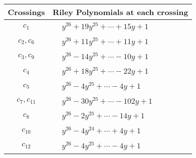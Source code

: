 \documentclass[1p]{elsarticle_modified}
\theoremstyle{definition}
\begin{document}
\begin{tabular}{m{50pt}|m{274pt}}
Crossings & \hspace{64pt}Riley Polynomials at each crossing \\
\hline $$\begin{aligned}c_{1}\end{aligned}$$&$\begin{aligned}
&y^{26}+19 y^{25}+\cdots+15 y+1
\end{aligned}$\\
\hline $$\begin{aligned}c_{2},c_{6}\end{aligned}$$&$\begin{aligned}
&y^{26}+11 y^{25}+\cdots+11 y+1
\end{aligned}$\\
\hline $$\begin{aligned}c_{3},c_{9}\end{aligned}$$&$\begin{aligned}
&y^{26}-14 y^{25}+\cdots-10 y+1
\end{aligned}$\\
\hline $$\begin{aligned}c_{4}\end{aligned}$$&$\begin{aligned}
&y^{26}+18 y^{25}+\cdots-22 y+1
\end{aligned}$\\
\hline $$\begin{aligned}c_{5}\end{aligned}$$&$\begin{aligned}
&y^{26}-4 y^{25}+\cdots-4 y+1
\end{aligned}$\\
\hline $$\begin{aligned}c_{7},c_{11}\end{aligned}$$&$\begin{aligned}
&y^{26}-30 y^{25}+\cdots-102 y+1
\end{aligned}$\\
\hline $$\begin{aligned}c_{8}\end{aligned}$$&$\begin{aligned}
&y^{26}-2 y^{25}+\cdots-14 y+1
\end{aligned}$\\
\hline $$\begin{aligned}c_{10}\end{aligned}$$&$\begin{aligned}
&y^{26}-4 y^{24}+\cdots+4 y+1
\end{aligned}$\\
\hline $$\begin{aligned}c_{12}\end{aligned}$$&$\begin{aligned}
&y^{26}-4 y^{25}+\cdots-4 y+1
\end{aligned}$\\
\hline
\end{tabular}\\~\\
\end{document}
